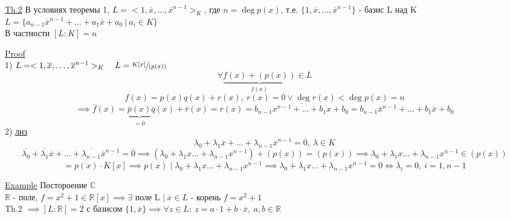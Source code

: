 \documentclass[a4paper]{article}
\begin{document}
\begin{tcolorbox}
\underline{Th.2} В условиях теоремы 1, $ L = <1, \overline{x}, \dots, 
\overline{x}^{n-1}>_K$, где $ n = \deg p(x) $, т.е. $ \{ 1, \overline{x},
\dots , \overline{x}^{n-1} \}$ - базис L над K\\
$ L = \{ a_{n-1} \overline{x}^{n-1} + \dots + a_1 \overline{x} + a_0 \ | \ a_i \in K \} $ \\
В частности $ [L:K] = n $ 

\underline{Proof}\\
1) $ L = <1, \overline{x}, \dots, \overline{x}^{n-1}>_K \quad L = \sfrac{K[x]}{(p(x))} $\\  
\[
    \forall \underbrace{f(x) + (p(x))}_{\overline{f}(x)} \in L
\]
\[
    f(x) = p(x)q(x) + r(x), \ r(x) = 0 \lor \deg r(x) < \deg p(x) = n
\]
\[
    \implies \overline{f}(x) = \underbrace{\overline{p}(x)}_{=\overline{0}}
    \overline{q}(x) + \overline{r}(x) = \overline{r}(x) = 
    \overline{b_{n-1} x^{n-1} + \dots + b_1 x + b_0} = 
    b_{n-1}\overline{x}^{n-1} + \dots + b_1 \overline{x} + b_0
\]
2) \underline{лнз}
\[
    \lambda_0 + \lambda_1 \overline{x} + \dots + \lambda_{n-1} \overline{x}^{n-1}
    = \overline{0}, \ \lambda \in K
\]
\[
    \overline{\lambda_0} + \overline{\lambda_1} \overline{x} + \dots + 
    \overline{\lambda_{n-1}} \overline{x}^{n-1} = \overline{0} \implies
    (\lambda_0 + \lambda_1 x \dots + \lambda_{n-1}x^{n-1}) + (p(x)) = (p(x)) \implies
    \lambda_0 + \lambda_1 x \dots + \lambda_{n-1}x^{n-1} \in (p(x))
\]
\[
    = p(x) \cdot K[x] \implies p(x) \mid \lambda_0 + \lambda_1 x \dots + 
    \lambda_{n-1}x^{n-1} \implies \lambda_0 + \lambda_1 x \dots + 
    \lambda_{n-1}x^{n-1} = 0 \iff \lambda_i = 0, \ i = \overline{1, n-1}
\]
\end{tcolorbox}

\begin{tcolorbox}
\underline{Example} Постороение $ \mathbb{C} $\\
$ \mathbb{R} $  - поле, $ f = x^2 + 1 \in \mathbb{R}[x] \implies \exists $ поле
L $| \  \overline{x} \in L $ - корень $ f = x^2 + 1 $ \\
Th.2 $ \implies [L:\mathbb{R}] = 2 $ с базисом $ \{ 1, \overline{x} \} \implies
\forall z \in L : \ z = a \cdot 1 + b \cdot \overline{x}, \ a,b \in \mathbb{R} $
\end{tcolorbox}
\end{document}

